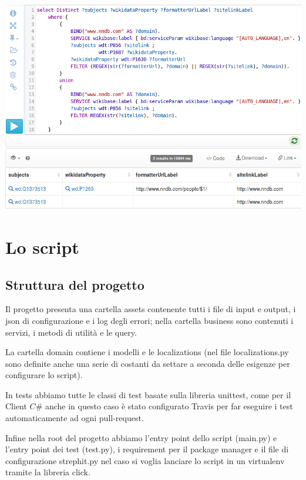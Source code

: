 \begin{center}
    \includegraphics[width=\linewidth]{Sources/Img/c04_01.png}
\end{center}

\section{Lo script}

\subsection{Struttura del progetto}
Il progetto presenta una cartella assets contenente tutti i file di input e output, i json di configurazione e i log degli errori; nella cartella business sono contenuti i servizi,
i metodi di utilità e le query. 

La cartella domain contiene i modelli e le localizations (nel file localizations.py sono definite anche una serie di costanti da settare a seconda 
delle esigenze per configurare lo script). 

In tests abbiamo tutte le classi di test basate sulla libreria unittest, come per il Client $C\#$ anche in questo caso è stato configurato Travis per far eseguire i test 
automaticamente ad ogni pull-request. 

Infine nella root del progetto abbiamo l'entry point dello script (main.py) e l'entry point dei test (test.py), i requirement per il package manager 
e il file di configurazione strephit.py nel caso si voglia lanciare lo script in un virtualenv tramite la libreria click.

